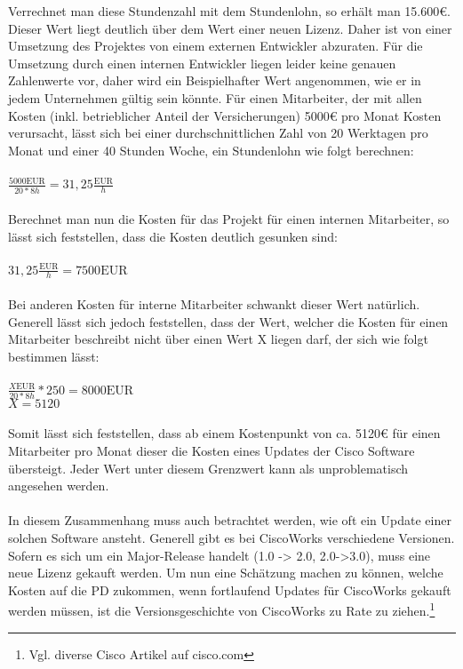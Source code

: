 Verrechnet man diese Stundenzahl mit dem Stundenlohn, so erhält man 15.600€. Dieser Wert liegt deutlich über dem Wert einer neuen Lizenz. Daher ist von einer Umsetzung des Projektes von einem externen Entwickler abzuraten. Für die Umsetzung durch einen internen Entwickler liegen leider keine genauen Zahlenwerte vor, daher wird ein Beispielhafter Wert angenommen, wie er in jedem Unternehmen gültig sein könnte. Für einen Mitarbeiter, der mit allen Kosten (inkl. betrieblicher Anteil der Versicherungen) 5000€ pro Monat Kosten verursacht, lässt sich bei einer durchschnittlichen Zahl von 20 Werktagen pro Monat und einer 40 Stunden Woche, ein Stundenlohn wie folgt berechnen:\\
\\
\(\frac{5000\text{EUR}}{20*8h}=31,25\frac{\text{EUR}}{h}\) 
\\
\\
Berechnet man nun die Kosten für das Projekt für einen internen Mitarbeiter, so lässt sich feststellen, dass die Kosten deutlich gesunken sind:\\
\\
\(31,25\frac{\text{EUR}}{h}=7500\text{EUR}\)
\\
\\
Bei anderen Kosten für interne Mitarbeiter schwankt dieser Wert natürlich. Generell lässt sich jedoch feststellen, dass der Wert, welcher die Kosten für einen Mitarbeiter beschreibt nicht über einen Wert X liegen darf, der sich wie folgt bestimmen lässt:\\
\\
\(\frac{X\text{EUR}}{20*8h}*250=8000\text{EUR}\)\\
\(X=5120\)\\
\\
Somit lässt sich feststellen, dass ab einem Kostenpunkt von ca. 5120€ für einen Mitarbeiter pro Monat dieser die Kosten eines Updates der Cisco Software übersteigt.
Jeder Wert unter diesem Grenzwert kann als unproblematisch angesehen werden.\\\\
In diesem Zusammenhang muss auch betrachtet werden, wie oft ein Update einer solchen Software ansteht.
Generell gibt es bei CiscoWorks verschiedene Versionen.
Sofern es sich um ein Major-Release handelt (1.0 -> 2.0, 2.0->3.0), muss eine neue Lizenz gekauft werden.
Um nun eine Schätzung machen zu können, welche Kosten auf die PD zukommen, wenn fortlaufend Updates für CiscoWorks gekauft werden müssen, ist die Versionsgeschichte von CiscoWorks zu Rate zu ziehen.\footnote{Vgl. diverse Cisco Artikel auf cisco.com}
